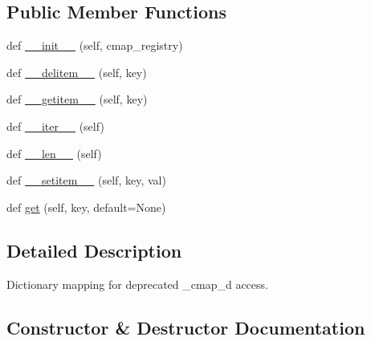 \subsection*{Public Member Functions}
\begin{DoxyCompactItemize}
\item 
def \hyperlink{classmatplotlib_1_1cm_1_1__DeprecatedCmapDictWrapper_af36c90e8906a3eb89e220ed522877350}{\+\_\+\+\_\+init\+\_\+\+\_\+} (self, cmap\+\_\+registry)
\item 
def \hyperlink{classmatplotlib_1_1cm_1_1__DeprecatedCmapDictWrapper_a856fa9123d38575fc0db84e8aad20278}{\+\_\+\+\_\+delitem\+\_\+\+\_\+} (self, key)
\item 
def \hyperlink{classmatplotlib_1_1cm_1_1__DeprecatedCmapDictWrapper_a37a959170d98108d853223ac28197b98}{\+\_\+\+\_\+getitem\+\_\+\+\_\+} (self, key)
\item 
def \hyperlink{classmatplotlib_1_1cm_1_1__DeprecatedCmapDictWrapper_a10e911b403b19f75204a1ad6b7ae00d1}{\+\_\+\+\_\+iter\+\_\+\+\_\+} (self)
\item 
def \hyperlink{classmatplotlib_1_1cm_1_1__DeprecatedCmapDictWrapper_a17fa29595afe216ca00c2ea20bf38b5a}{\+\_\+\+\_\+len\+\_\+\+\_\+} (self)
\item 
def \hyperlink{classmatplotlib_1_1cm_1_1__DeprecatedCmapDictWrapper_a1c5f64d7389ddbf0a18696c275264c2f}{\+\_\+\+\_\+setitem\+\_\+\+\_\+} (self, key, val)
\item 
def \hyperlink{classmatplotlib_1_1cm_1_1__DeprecatedCmapDictWrapper_af723d4e70d20a2e4c8afd8374f0e971c}{get} (self, key, default=None)
\end{DoxyCompactItemize}


\subsection{Detailed Description}
\begin{DoxyVerb}Dictionary mapping for deprecated _cmap_d access.\end{DoxyVerb}
 

\subsection{Constructor \& Destructor Documentation}
\mbox{\label{classmatplotlib_1_1cm_1_1__DeprecatedCmapDictWrapper_af36c90e8906a3eb89e220ed522877350}} 
